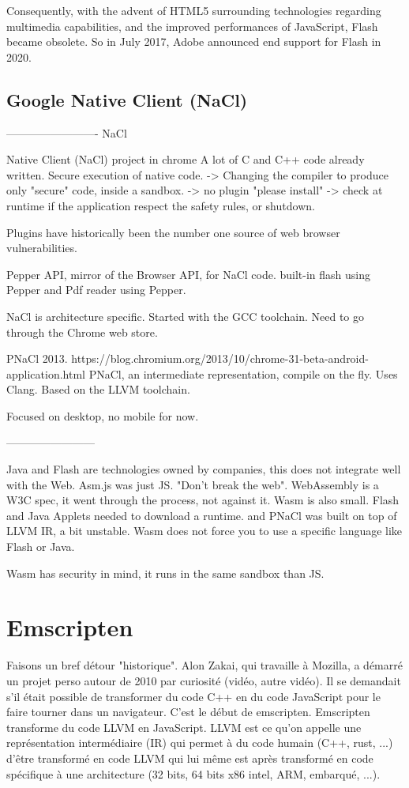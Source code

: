 Consequently, with the advent of HTML5 surrounding technologies regarding multimedia capabilities,
and the improved performances of JavaScript, Flash became obsolete.
So in July 2017, Adobe announced end support for Flash in 2020.

\subsection{Google Native Client (NaCl)}%
\label{sub:nacl}


------------------------- NaCl

Native Client (NaCl) project in chrome
A lot of C and C++ code already written.
Secure execution of native code.
-> Changing the compiler to produce only "secure" code, inside a sandbox.
-> no plugin "please install"
-> check at runtime if the application respect the safety rules, or shutdown.

Plugins have historically been the number one source of web browser vulnerabilities.

Pepper API, mirror of the Browser API, for NaCl code.
built-in flash using Pepper and Pdf reader using Pepper.

NaCl is architecture specific. Started with the GCC toolchain.
Need to go through the Chrome web store.

PNaCl 2013.
https://blog.chromium.org/2013/10/chrome-31-beta-android-application.html
PNaCl, an intermediate representation, compile on the fly. Uses Clang.
Based on the LLVM toolchain.

Focused on desktop, no mobile for now.

------------------------

Java and Flash are technologies owned by companies, this does not integrate well with the Web.
Asm.js was just JS. "Don't break the web".
WebAssembly is a W3C spec, it went through the process, not against it.
Wasm is also small. Flash and Java Applets needed to download a runtime. and PNaCl was built
on top of LLVM IR, a bit unstable.
Wasm does not force you to use a specific language like Flash or Java.

Wasm has security in mind, it runs in the same sandbox than JS.

\section{Emscripten}%
\label{sec:Emscripten}

Faisons un bref détour "historique". Alon Zakai, qui travaille à Mozilla, a démarré un projet perso autour de 2010 par curiosité (vidéo, autre vidéo). Il se demandait s’il était possible de transformer du code C++ en du code JavaScript pour le faire tourner dans un navigateur. C’est le début de emscripten. Emscripten transforme du code LLVM en JavaScript. LLVM est ce qu’on appelle une représentation intermédiaire (IR) qui permet à du code humain (C++, rust, ...) d’être transformé en code LLVM qui lui même est après transformé en code spécifique à une architecture (32 bits, 64 bits x86 intel, ARM, embarqué, ...).

